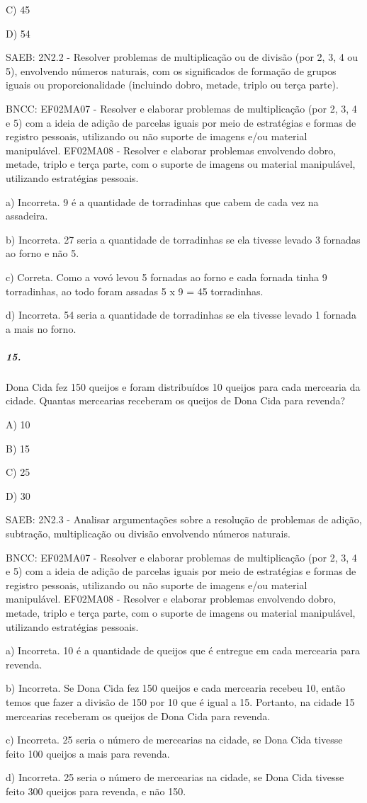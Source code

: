 C) 45

D) 54

SAEB: 2N2.2 - Resolver problemas de multiplicação ou de divisão (por 2,
3, 4 ou 5), envolvendo números naturais, com os significados de formação
de grupos iguais ou proporcionalidade (incluindo dobro, metade, triplo
ou terça parte).

BNCC: EF02MA07 - Resolver e elaborar problemas de multiplicação (por 2,
3, 4 e 5) com a ideia de adição de parcelas iguais por meio de
estratégias e formas de registro pessoais, utilizando ou não suporte de
imagens e/ou material manipulável. EF02MA08 - Resolver e elaborar
problemas envolvendo dobro, metade, triplo e terça parte, com o suporte
de imagens ou material manipulável, utilizando estratégias pessoais.

a) Incorreta. 9 é a quantidade de torradinhas que cabem de cada vez na
assadeira.

b) Incorreta. 27 seria a quantidade de torradinhas se ela tivesse levado
3 fornadas ao forno e não 5.

c) Correta. Como a vovó levou 5 fornadas ao forno e cada fornada tinha 9
torradinhas, ao todo foram assadas 5 x 9 = 45 torradinhas.

d) Incorreta. 54 seria a quantidade de torradinhas se ela tivesse levado
1 fornada a mais no forno.

\subparagraph{15. }\label{section-159}

Dona Cida fez 150 queijos e foram distribuídos 10 queijos para cada
mercearia da cidade. Quantas mercearias receberam os queijos de Dona
Cida para revenda?

A) 10

B) 15

C) 25

D) 30

SAEB: 2N2.3 - Analisar argumentações sobre a resolução de problemas de
adição, subtração, multiplicação ou divisão envolvendo números naturais.

BNCC: EF02MA07 - Resolver e elaborar problemas de multiplicação (por 2,
3, 4 e 5) com a ideia de adição de parcelas iguais por meio de
estratégias e formas de registro pessoais, utilizando ou não suporte de
imagens e/ou material manipulável. EF02MA08 - Resolver e elaborar
problemas envolvendo dobro, metade, triplo e terça parte, com o suporte
de imagens ou material manipulável, utilizando estratégias pessoais.

a) Incorreta. 10 é a quantidade de queijos que é entregue em cada
mercearia para revenda.

b) Incorreta. Se Dona Cida fez 150 queijos e cada mercearia recebeu 10,
então temos que fazer a divisão de 150 por 10 que é igual a 15.
Portanto, na cidade 15 mercearias receberam os queijos de Dona Cida para
revenda.

c) Incorreta. 25 seria o número de mercearias na cidade, se Dona Cida
tivesse feito 100 queijos a mais para revenda.

d) Incorreta. 25 seria o número de mercearias na cidade, se Dona Cida
tivesse feito 300 queijos para revenda, e não 150.
